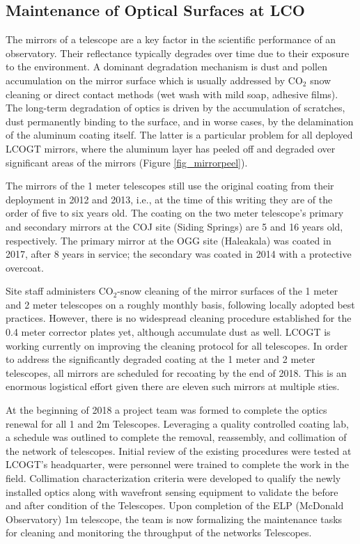 \documentclass[]{spieman}
\begin{document}
\subsection{Maintenance of Optical Surfaces at LCO}


The mirrors of a telescope are a key factor in the  scientific performance of an observatory.
Their reflectance typically degrades over time due to their exposure to the environment. A dominant
degradation mechanism is dust and pollen accumulation on the mirror surface which is usually
addressed by CO$_2$ snow cleaning or direct contact methods (wet wash with mild soap, adhesive films).
The long-term degradation of optics is driven by the accumulation of scratches, dust permanently
binding to the surface, and in worse cases, by the delamination of the aluminum coating itself. The
latter is a particular problem for all deployed LCOGT mirrors, where the aluminum layer has
peeled off and degraded over significant areas of the mirrors (Figure \ref{fig_mirrorpeel}). 

The mirrors of the 1 meter telescopes still use the original coating from their deployment in 2012 
and 2013, i.e., at the time of this writing they are of the order of five to six years old. The
coating  on the two meter telescope's  primary and secondary mirrors at the COJ site (Siding
Springs) are 5  and 16 years old, respectively. The primary  mirror at the OGG site (Haleakala) was
coated in 2017, after 8 years in service; the secondary  was coated in 2014 with a protective 
overcoat.   

Site staff administers CO$_2$-snow cleaning of the mirror surfaces of the 1 meter and 2 meter
telescopes on a roughly monthly basis, following locally adopted best practices. However, there is no 
widespread cleaning procedure established for the 0.4 meter corrector plates yet, although accumulate
dust as well. LCOGT is working currently on improving the cleaning protocol for all
telescopes. In order to address the significantly degraded coating at the 1 meter and 2 meter
telescopes, all mirrors are scheduled for recoating by the end of 2018. This is an enormous
logistical effort given there are eleven such mirrors at multiple sties.

At the beginning of 2018 a project team was formed to complete the optics renewal for all 1 and
2m Telescopes.  Leveraging a quality controlled coating lab, a schedule was outlined to complete
the removal, reassembly, and collimation of the network of telescopes.  Initial review of the
existing procedures were tested at LCOGT's headquarter, were personnel were trained to complete the
work in the field.  Collimation characterization criteria were developed to qualify the newly
installed optics along with wavefront sensing equipment to validate the before and after condition
of the Telescopes.  Upon completion of the ELP (McDonald Observatory) 1m telescope, the team is now
formalizing the maintenance tasks for cleaning and monitoring the throughput of the networks 
Telescopes.
\end{document}
